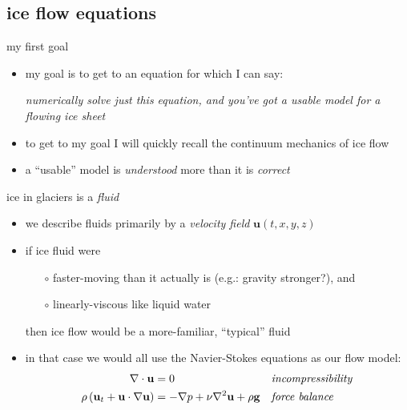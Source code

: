 \subsection{ice flow equations}

\begin{frame}{my first goal}

\begin{itemize}
\item my goal is to get to an equation for which I can say:
\bigskip

\begin{center}
\emph{numerically solve just this equation, and you've got a usable model for a flowing ice sheet}
\end{center}
\bigskip

\item to get to my goal I will quickly recall the continuum mechanics of ice flow
\item a ``usable'' model is \emph{understood} more than it is \emph{correct}
\end{itemize}
\end{frame}

\begin{frame}{ice in glaciers is a \emph{fluid}}

\begin{itemize}
\item we describe fluids primarily by a \emph{velocity field} $\mathbf{u}(t,x,y,z)$
\item if ice fluid were
  \begin{itemize}
  \item[$\circ$] faster-moving than it actually is (e.g.: gravity stronger?), and
  \item[$\circ$] linearly-viscous like liquid water
  \end{itemize}
  
  then ice flow would be a more-familiar, ``typical'' fluid
\item in that case we would all use the Navier-Stokes equations as our flow model:
\begin{align*}
\nabla \cdot \mathbf{u} &= 0 &&\text{\emph{incompressibility}} \\
\rho \left(\mathbf{u}_t + \mathbf{u}\cdot\nabla \mathbf{u}\right) &= -\nabla p + \nu \nabla^2 \mathbf{u} + \rho \mathbf{g} &&\text{\emph{force balance}}
\end{align*}
\end{itemize}
\end{frame}


